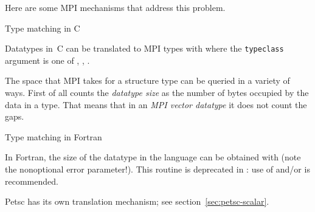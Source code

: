 Here are some MPI mechanisms that address this problem.

 {Type matching in C}
\label{sec:mpi-type-match-c}

Datatypes in~C can be translated to MPI types with
%
%
where the \lstinline{typeclass} argument is one of
,
,
.


The space that MPI takes for a structure type can be queried in a
variety of ways. First of all  counts the
\emph{datatype size} as the 
number of bytes occupied by the data in a type. That means that in an
\emph{MPI vector datatype} it does not
count the gaps.
%

\begin{comment}
In C, the \indexmpidef{MPI_Datatype} type is defined through the pre-processor,
allowing you to write:
\cverbatimsnippet{datatypevar}
\end{comment}

 {Type matching in Fortran}
\label{sec:mpi-type-match-f}

In Fortran, the size of the datatype in the language can be obtained with
 (note the nonoptional error parameter!).
This routine is deprecated in : use of
 and/or  is recommended.


Petsc has its own translation mechanism; see section~\ref{sec:petsc-scalar}.



